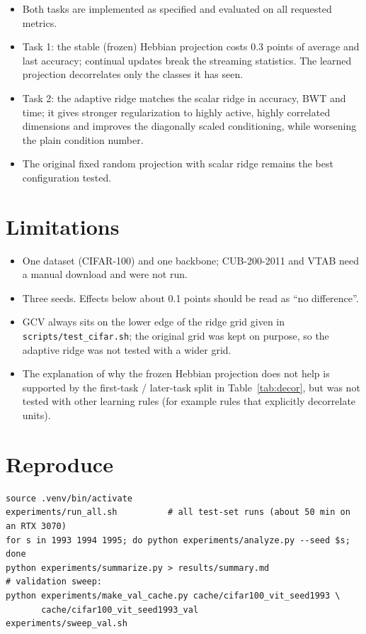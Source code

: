 \documentclass[11pt,a4paper]{article}
\begin{document}
\begin{itemize}
  \item Both tasks are implemented as specified and evaluated on all requested metrics.
  \item Task 1: the stable (frozen) Hebbian projection costs 0.3 points of average and last
        accuracy; continual updates break the streaming statistics. The learned projection
        decorrelates only the classes it has seen.
  \item Task 2: the adaptive ridge matches the scalar ridge in accuracy, BWT and time; it gives
        stronger regularization to highly active, highly correlated dimensions and improves the
        diagonally scaled conditioning, while worsening the plain condition number.
  \item The original fixed random projection with scalar ridge remains the best configuration tested.
\end{itemize}

\section{Limitations}

\begin{itemize}
  \item One dataset (CIFAR-100) and one backbone; CUB-200-2011 and VTAB need a manual download and
        were not run.
  \item Three seeds. Effects below about 0.1 points should be read as ``no difference''.
  \item GCV always sits on the lower edge of the ridge grid given in \texttt{scripts/test\_cifar.sh};
        the original grid was kept on purpose, so the adaptive ridge was not tested with a wider grid.
  \item The explanation of why the frozen Hebbian projection does not help is supported by the
        first-task / later-task split in Table~\ref{tab:decor}, but was not tested with other
        learning rules (for example rules that explicitly decorrelate units).
\end{itemize}

\section{Reproduce}

\begin{verbatim}
source .venv/bin/activate
experiments/run_all.sh          # all test-set runs (about 50 min on an RTX 3070)
for s in 1993 1994 1995; do python experiments/analyze.py --seed $s; done
python experiments/summarize.py > results/summary.md
# validation sweep:
python experiments/make_val_cache.py cache/cifar100_vit_seed1993 \
       cache/cifar100_vit_seed1993_val
experiments/sweep_val.sh
\end{verbatim}
\end{document}
